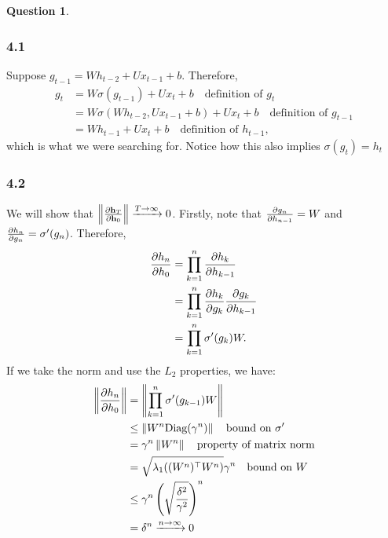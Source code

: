 \documentclass[12pt]{article}
\theoremstyle{definition}
\newtheorem{exercise}{Question}%
\begin{document}
\begin{exercise}
{    \subsubsection*{4.1}
    Suppose $g_{t-1} = W h _{t-2} +U x_{t-1} + b$. Therefore,
    \begin{align*}
    g_{t}   &= W \sigma(g_{t-1}) + U x_{t} + b \quad \text{definition of $g_{t}$}\\
           &= W \sigma(W h_{t-2} , U x_{t-1} + b) + U x_{t} + b \quad  \text{definition
             of $g_{t-1}$}\\
           &= W h_{t-1} + U x_{t} + b \quad \text{definition of $h_{t-1}$},
    \end{align*}which is what we were searching for. Notice how this also
    implies $\sigma(g_{t})= h_{t}$
    \subsubsection*{4.2}
    We will show that
    $\left\Vert \frac{\partial \mathbf{h}_{T}}{\partial \mathbf{h}_{0}} \right\Vert \xrightarrow{T\to \infty}0$.
    Firstly, note that $\frac{\partial g_{n}}{\partial h_{n-1}} = W $ and
    $\frac{\partial h_{n}}{\partial g_{n}} = \sigma'(g_{n})$. Therefore,
    \begin{align*}
      \frac{\partial h_{n}}{\partial h_{0}} &= \prod_{k = 1}^{n} \frac{\partial h_{k}}{\partial h_{k-1}}\\
      &= \prod_{k =1}^{n} \frac{\partial h_{k}}{\partial g_{k}} \frac{\partial g_{k}}{\partial h_{k-1}} \\
      &= \prod_{k=1}^{n}  \sigma'(g_{k})W.
    \end{align*}
    If we take the norm and use the $L_{2}$ properties, we have:
    \begin{align*}
      \left\Vert \frac{\partial h_{n}}{\partial h_{0}} \right\Vert &= \left\Vert \prod_{k=1}^{n}  \sigma'(g_{k-1})W \right\Vert\\
                               &\leq \left\Vert W^{n} \text{Diag}(\gamma^{n}) \right\Vert \quad \text{bound
                                 on $\sigma'$}\\
                               &= \gamma^{n} \left\Vert W^{n} \right\Vert \quad \text{property of matrix norm}\\
                               &= \sqrt{\lambda_{1}((W^{n})^{\top}W^{n})}\gamma^{n}\quad \text{bound
                                 on $W$}\\
                               & \leq \gamma^{n} \left( \sqrt{\frac{\delta^{2}}{\gamma^{2}}} \right)^{n}\\
                               &= \delta^{n} \xrightarrow{n \to \infty}0
    \end{align*}
}
\end{exercise}
\end{document}
